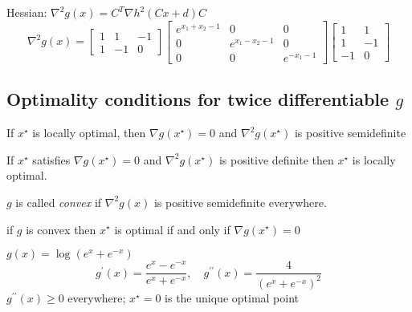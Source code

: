 \begin{example}
Hessian: $ \nabla^{2} g(x)=C^{T} \nabla h^{2}(C x+d) C $
\begin{equation}
\nabla^{2} g(x)=\left[\begin{array}{rrr}
1 & 1 & -1 \\
1 & -1 & 0
\end{array}\right]\left[\begin{array}{ccc}
e^{x_{1}+x_{2}-1} & 0 & 0 \\
0 & e^{x_{1}-x_{2}-1} & 0 \\
0 & 0 & e^{-x_{1}-1}
\end{array}\right]\left[\begin{array}{rr}
1 & 1 \\
1 & -1 \\
-1 & 0
\end{array}\right]
\end{equation}
\end{example}

\subsection{Optimality conditions for twice differentiable $ g $}

\begin{theorem}
    If $ x^{\star} $ is locally optimal, then
$ \nabla g\left(x^{\star}\right)=0 $ and $ \nabla^{2} g\left(x^{\star}\right) $ is positive semidefinite
\end{theorem}

\begin{theorem}
    If $ x^{\star} $ satisfies
$ \nabla g\left(x^{\star}\right)=0 $ and $ \nabla^{2} g\left(x^{\star}\right) $ is positive definite
then $ x^{\star} $ is locally optimal.
\end{theorem}

\begin{definition}
    $ g $ is called \textit{convex} if $ \nabla^{2} g(x) $ is positive semidefinite everywhere.
\end{definition}

\begin{theorem}
    if $ g $ is convex then $ x^{\star} $ is optimal if and only if $ \nabla g\left(x^{\star}\right)=0 $
\end{theorem}




\begin{example}
    $ g(x)=\log \left(e^{x}+e^{-x}\right) $
\begin{equation}
g^{\prime}(x)=\frac{e^{x}-e^{-x}}{e^{x}+e^{-x}}, \quad g^{\prime \prime}(x)=\frac{4}{\left(e^{x}+e^{-x}\right)^{2}}
\end{equation}
$ g^{\prime \prime}(x) \geq 0 $ everywhere; $ x^{\star}=0 $ is the unique optimal point
\end{example}

